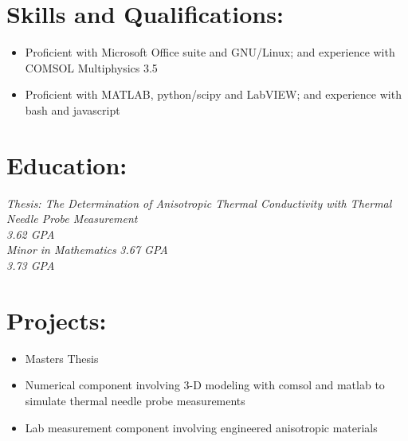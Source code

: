 \documentclass{resume}
\author{ Joshua Holbrook }
\begin{document}
\maketitle

\section{Skills and Qualifications:}
\small
\begin{itemize}
    \item Proficient with Microsoft Office suite and GNU/Linux; and experience with COMSOL Multiphysics 3.5
    \item Proficient with MATLAB, python/scipy and LabVIEW; and experience with bash and javascript

\end{itemize}
\normalsize

\section{Education:}
        \textit{Thesis: The Determination of Anisotropic Thermal Conductivity with Thermal Needle Probe Measurement}\\
        \emph{ 3.62 GPA}\\
        
        \textit{Minor in Mathematics}
        \emph{ 3.67 GPA}\\
        
        \emph{ 3.73 GPA}\\

\section{Projects:}
    \small
    \begin{itemize}
        \item Masters Thesis
        \item Numerical component involving 3-D modeling with comsol and matlab to simulate thermal needle probe measurements
        \item Lab measurement component involving engineered anisotropic materials
    \end{itemize}
    \normalsize
\end{document}
